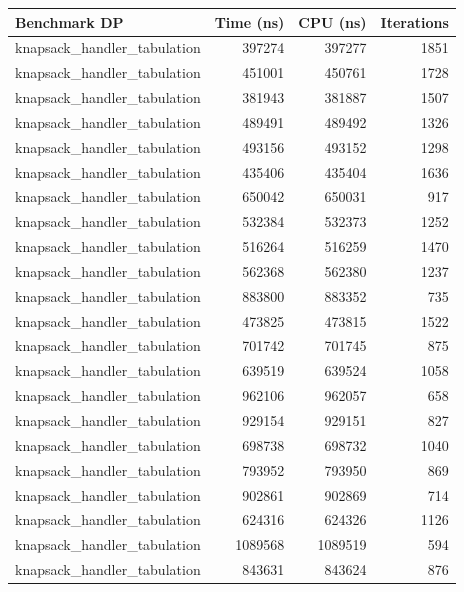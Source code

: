 \documentclass{llncs}
\begin{document}
\begin{table}[ht]
    \centering
    \begin{tabular}{@{}lrrr@{}}
		\toprule
        \textbf{Benchmark DP} & \textbf{Time (ns)} & \textbf{CPU (ns)} & \textbf{Iterations} \\
		\midrule
        knapsack\_handler\_tabulation & 397274 & 397277 & 1851 \\
        knapsack\_handler\_tabulation & 451001 & 450761 & 1728 \\
        knapsack\_handler\_tabulation & 381943 & 381887 & 1507 \\
        knapsack\_handler\_tabulation & 489491 & 489492 & 1326 \\
        knapsack\_handler\_tabulation & 493156 & 493152 & 1298 \\
        knapsack\_handler\_tabulation & 435406 & 435404 & 1636 \\
        knapsack\_handler\_tabulation & 650042 & 650031 & 917 \\
        knapsack\_handler\_tabulation & 532384 & 532373 & 1252 \\
        knapsack\_handler\_tabulation & 516264 & 516259 & 1470 \\
        knapsack\_handler\_tabulation & 562368 & 562380 & 1237 \\
        knapsack\_handler\_tabulation & 883800 & 883352 & 735 \\
        knapsack\_handler\_tabulation & 473825 & 473815 & 1522 \\
        knapsack\_handler\_tabulation & 701742 & 701745 & 875 \\
        knapsack\_handler\_tabulation & 639519 & 639524 & 1058 \\
        knapsack\_handler\_tabulation & 962106 & 962057 & 658 \\
        knapsack\_handler\_tabulation & 929154 & 929151 & 827 \\
        knapsack\_handler\_tabulation & 698738 & 698732 & 1040 \\
        knapsack\_handler\_tabulation & 793952 & 793950 & 869 \\
        knapsack\_handler\_tabulation & 902861 & 902869 & 714 \\
        knapsack\_handler\_tabulation & 624316 & 624326 & 1126 \\
        knapsack\_handler\_tabulation & 1089568 & 1089519 & 594 \\
        knapsack\_handler\_tabulation & 843631 & 843624 & 876 \\

\end{tabular}
\end{table}
\end{document}
